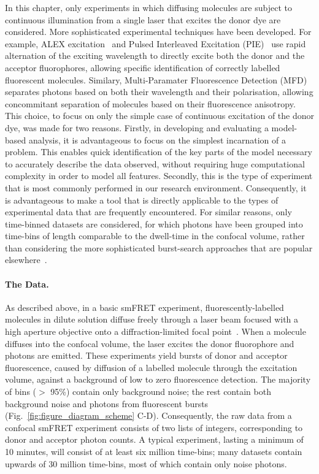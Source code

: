 In this chapter, only experiments in which diffusing molecules are subject to continuous illumination from a single laser that excites the donor dye are considered. More sophisticated experimental techniques have been developed. For example, ALEX excitation~\cite{kapanidis05, lee07} and Pulsed Interleaved Excitation (PIE)~\cite{muller05, kudryavtsev2012} use rapid alternation of the exciting wavelength to directly excite both the donor and the acceptor fluorophores, allowing specific identification of correctly labelled fluorescent molecules. Similary, Multi-Paramater Fluorescence Detection (MFD)~\cite{sisamakis2010, rothwell2002} separates photons based on both their wavelength and their polarisation, allowing concommitant separation of molecules based on their fluorescence anisotropy. This choice, to focus on only the simple case of continuous excitation of the donor dye, was made for two reasons. Firstly, in developing and evaluating a model-based analysis, it is advantageous to focus on the simplest incarnation of a problem. This enables quick identification of the key parts of the model necessary to accurately describe the data observed, without requiring huge computational complexity in order to model all features. Secondly, this is the type of experiment that is most commonly performed in our research environment. Consequently, it is advantageous to make a tool that is directly applicable to the types of experimental data that are frequently encountered. For similar reasons, only time-binned datasets are considered, for which photons have been grouped into time-bins of length comparable to the dwell-time in the confocal volume, rather than considering the more sophisticated burst-search approaches that are popular elsewhere~\cite{nir06}. 

\paragraph{The Data.}
As described above, in a basic smFRET experiment, fluorescently-labelled molecules in dilute solution diffuse freely through a laser beam focused with a high aperture objective onto a diffraction-limited focal point~\cite{schuler05}.  When a molecule diffuses into the confocal volume, the laser excites the donor fluorophore and photons are emitted. These experiments yield bursts of donor and acceptor fluorescence, caused by diffusion of a labelled molecule through the excitation volume, against a background of low to zero fluorescence detection. The majority of bins ($>$ 95\%) contain only background noise; the rest contain both background noise and photons from fluorescent bursts (Fig.~\ref{fig:figure_diagram_scheme} C-D). Consequently, the raw data from a confocal smFRET experiment consists of two lists of integers, corresponding to donor and acceptor photon counts. A typical experiment, lasting a minimum of 10 minutes, will consist of at least six million time-bins; many datasets contain upwards of 30 million time-bins, most of which contain only noise photons. 

